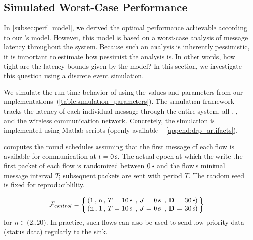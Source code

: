 

\subsection{Simulated Worst-Case Performance}
\label{subsec:simulation}

In \cref{subsec:perf_model}, we derived the optimal performance achievable according to our \DRP's model.
However, this model is based on a worst-case analysis of message latency throughout the system.
Because such an analysis is inherently pessimistic, it is important to estimate how pessimist the analysis is. In other words, how tight are the latency bounds given by the model?
In this section, we investigate this question using a discrete event simulation.

We simulate the run-time behavior of \DRP using the values and parameters from our implementations~(\cref{table:simulation_parameters}).
The simulation framework tracks the latency of each individual message through the entire system, \ie all \APs, \CPs, \bolt and the wireless communication network.
Concretely, the simulation is implemented using Matlab scripts (openly available -- \cref{append:drp_artifacts}).

\blink computes the round schedules assuming that the first message of each flow is available for communication at $t = 0\,\text{s}$. The actual epoch at which the  \APs write the first packet of each flow is randomized between $0\,\text{s}$ and the flow's minimal message interval $T$; subsequent packets are sent with period $T$.
The random seed is fixed for reproduciblility.

\[
\mathcal{F}_{control} =
	\left\lbrace
	\begin{tabular}{@{\,}l@{\,}}
	(1\,, n\,, \periodany = 10\s\,, \jitterany = 0\s\,, \deadlineany = 30\s )\\
	(n\,, 1\,, \periodany = 10\s\,, \jitterany = 0\s\,, \deadlineany = 30\s )\\
	\end{tabular}
	\right\rbrace
\]
for $n \in ($2$ .. $20$)$. In practice, such flows can also be used to send low-priority data (\eg status data) regularly to the sink.

